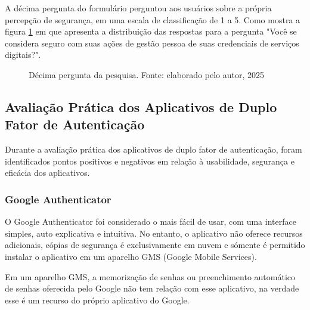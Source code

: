 \documentclass[12pt]{article}
\begin{document}
A décima pergunta do formulário perguntou aos usuários sobre a própria percepção de segurança,
em uma escala de classificação de 1 a 5.
Como mostra a figura \ref{fig:resposta_10} em que apresenta a distribuição das
respostas para a pergunta "Você se considera seguro com suas ações de gestão pessoa de suas
credenciais de serviços digitais?".

\begin{figure}[htb]
    \centering
    \caption{Décima pergunta da pesquisa. Fonte: elaborado pelo autor, 2025}
    \label{fig:resposta_10}
\end{figure}
\FloatBarrier

\subsection{Avaliação Prática dos Aplicativos de Duplo Fator de Autenticação}

Durante a avaliação prática dos aplicativos de duplo fator de autenticação,
foram identificados pontos positivos e negativos em relação à usabilidade,
segurança e eficácia dos aplicativos.

\subsubsection{Google Authenticator}

O Google Authenticator foi considerado o mais fácil de usar, com uma
interface simples, auto explicativa e intuitiva.
No entanto, o aplicativo não oferece recursos adicionais, cópias de segurança
é exclusivamente em nuvem e sómente é permitido instalar o aplicativo em um
aparelho GMS (Google Mobile Services).

Em um aparelho GMS, a memorização de senhas ou preenchimento automático de
senhas oferecida pelo Google não tem relação com esse aplicativo, na verdade
esse é um recurso do próprio aplicativo do Google.
\end{document}
